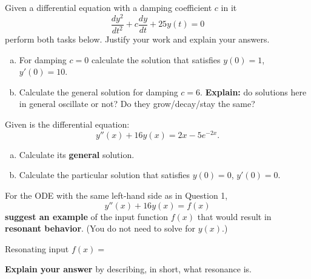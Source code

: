 \documentclass[10pt,twoside,sfsidenotes]{tufte-handout}
\begin{document}
  \begin{question} %
    Given a differential equation with a damping coefficient \(c\) in it
    \[
      \frac{dy^{2}}{dt^{2}} + c \frac{dy}{dt} + 25 y(t) = 0
    \]
    perform both tasks below. Justify your work and explain your answers.

    \begin{enumerate}[(a)]
      \item For damping \(c = 0\) calculate the solution that satisfies \(y(0) = 1\), \(y'(0) = 10\). 
      \item Calculate the general solution for damping \(c = 6\). \textbf{Explain:} do solutions here in general oscillate or not? Do they grow/decay/stay the same?
    \end{enumerate}
  \end{question}



\begin{fullwidth}
  \begin{question} %
    Given is the differential equation:
    \[
      y''(x) + 16 y(x) = 2x - 5e^{-2x}.
    \]
    \begin{enumerate}[(a)]
      \item Calculate its \textbf{general} solution. 
      \item Calculate the particular solution that satisfies \(y(0) = 0\), \(y'(0) = 0\).
    \end{enumerate}
  \end{question}
\end{fullwidth}
\clearpage
\thispagestyle{plain}
\begin{fullwidth}
  \begin{question} %
    For the ODE with the same left-hand side as in Question 1,
    \[
      y''(x) + 16 y(x) = f(x)
    \]
    \textbf{suggest an example} of the input function \(f(x)\)  that would result in \textbf{resonant behavior}. (You do not need to solve for \(y(x)\).)

  \vspace{2em}

    {\Large  Resonating input \( f(x) = \)}

  \vspace{2em}

  \textbf{Explain your answer} by describing, in short, what resonance is.

  \blank[width=3.99\linewidth,linespread=2]{}
\end{question}
\end{fullwidth}
\clearpage
\end{document}
